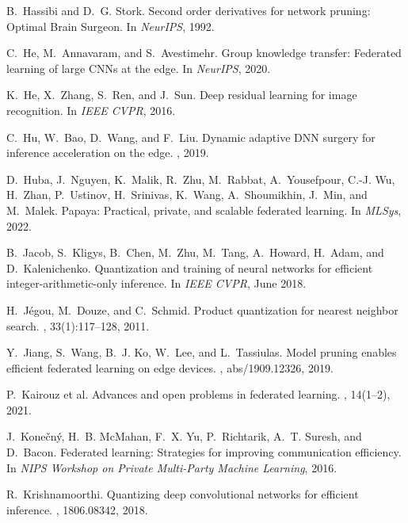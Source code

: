 \documentclass[11pt]{article}
\begin{document}
\begin{thebibliography}{10}
\begin{small}
B.~Hassibi and D.~G. Stork.
\newblock Second order derivatives for network pruning: {O}ptimal {B}rain
  {S}urgeon.
\newblock In {\em NeurIPS}, 1992.

C.~He, M.~Annavaram, and S.~Avestimehr.
\newblock Group knowledge transfer: Federated learning of large {CNN}s at the
  edge.
\newblock In {\em NeurIPS}, 2020.

K.~He, X.~Zhang, S.~Ren, and J.~Sun.
\newblock Deep residual learning for image recognition.
\newblock In {\em {IEEE} CVPR}, 2016.

C.~Hu, W.~Bao, D.~Wang, and F.~Liu.
\newblock Dynamic adaptive {DNN} surgery for inference acceleration on the
  edge.
, 2019.

D.~Huba, J.~Nguyen, K.~Malik, R.~Zhu, M.~Rabbat, A.~Yousefpour, C.-J. Wu,
  H.~Zhan, P.~Ustinov, H.~Srinivas, K.~Wang, A.~Shoumikhin, J.~Min, and
  M.~Malek.
\newblock Papaya: Practical, private, and scalable federated learning.
\newblock In {\em MLSys}, 2022.

B.~Jacob, S.~Kligys, B.~Chen, M.~Zhu, M.~Tang, A.~Howard, H.~Adam, and
  D.~Kalenichenko.
\newblock Quantization and training of neural networks for efficient
  integer-arithmetic-only inference.
\newblock In {\em IEEE CVPR}, June 2018.

H.~J{\'{e}}gou, M.~Douze, and C.~Schmid.
\newblock Product quantization for nearest neighbor search.
, 33(1):117--128,
  2011.

Y.~Jiang, S.~Wang, B.~J. Ko, W.~Lee, and L.~Tassiulas.
\newblock Model pruning enables efficient federated learning on edge devices.
, abs/1909.12326, 2019.

P.~{Kairouz et al.}
\newblock Advances and open problems in federated learning.
, 14(1–2), 2021.

J.~Konečný, H.~B. McMahan, F.~X. Yu, P.~Richtarik, A.~T. Suresh, and
  D.~Bacon.
\newblock Federated learning: Strategies for improving communication
  efficiency.
\newblock In {\em NIPS Workshop on Private Multi-Party Machine Learning}, 2016.

R.~Krishnamoorthi.
\newblock Quantizing deep convolutional networks for efficient inference.
, 1806.08342, 2018.


\end{small}
\end{thebibliography}
\end{document}
